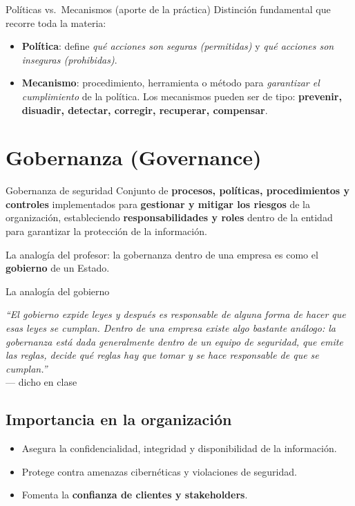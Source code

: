 \documentclass[11pt,a4paper]{article}
\newcommand{\prof}[1]{\par\medskip\noindent\textit{``#1''}\\[-2pt]\hspace*{1em}%
  {\footnotesize\textcolor{black!60}{--- dicho en clase}}\par\medskip\noindent}
\begin{document}
\begin{practbox}{Políticas vs.\ Mecanismos (aporte de la práctica)}
Distinción fundamental que recorre toda la materia:
\begin{itemize}[leftmargin=1.4em,itemsep=2pt]
  \item \textbf{Política}: define \emph{qué acciones son seguras (permitidas)} y \emph{qué
        acciones son inseguras (prohibidas)}.
  \item \textbf{Mecanismo}: procedimiento, herramienta o método para \emph{garantizar el
        cumplimiento} de la política. Los mecanismos pueden ser de tipo:
        \textbf{prevenir, disuadir, detectar, corregir, recuperar, compensar}.
\end{itemize}
\end{practbox}

\section{Gobernanza (Governance)}

\begin{defbox}{Gobernanza de seguridad}
Conjunto de \textbf{procesos, políticas, procedimientos y controles} implementados para
\textbf{gestionar y mitigar los riesgos} de la organización, estableciendo
\textbf{responsabilidades y roles} dentro de la entidad para garantizar la protección de la
información.
\end{defbox}

La analogía del profesor: la gobernanza dentro de una empresa es como el \textbf{gobierno} de
un Estado.

\begin{anecbox}{La analogía del gobierno}
\prof{El gobierno expide leyes y después es responsable de alguna forma de hacer que esas
leyes se cumplan. Dentro de una empresa existe algo bastante análogo: la gobernanza está dada
generalmente dentro de un equipo de seguridad, que emite las reglas, decide qué reglas hay que
tomar y se hace responsable de que se cumplan.}
\end{anecbox}

\subsection{Importancia en la organización}
\begin{itemize}[leftmargin=1.4em,itemsep=1pt]
  \item Asegura la confidencialidad, integridad y disponibilidad de la información.
  \item Protege contra amenazas cibernéticas y violaciones de seguridad.
  \item Fomenta la \textbf{confianza de clientes y stakeholders}.
\end{itemize}
\end{document}
